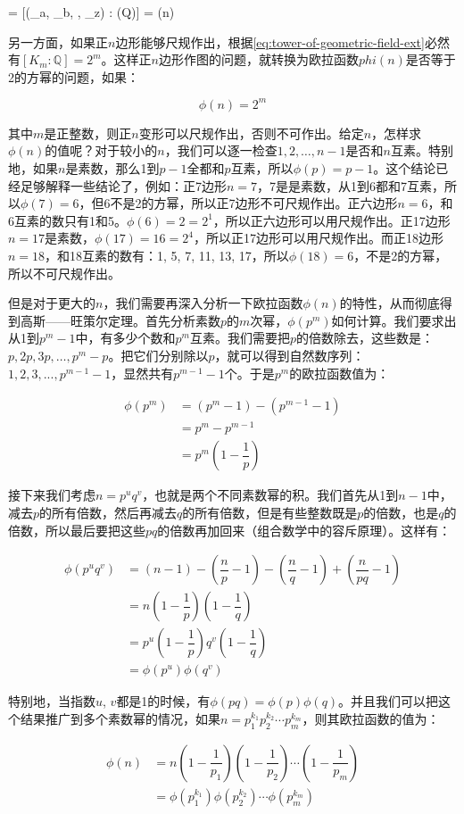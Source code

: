 \be
[K_m : \mathbb{Q}] = [(\zeta_a, \zeta_b, \dotsc, \zeta_z) : \mathbb(Q)] = \phi(n)
\ee

另一方面，如果正$n$边形能够尺规作出，根据\cref{eq:tower-of-geometric-field-ext}必然有$[K_m : \mathbb{Q}] = 2^m$。这样正$n$边形作图的问题，就转换为欧拉函数$phi(n)$是否等于2的方幂的问题，如果：

\[
\phi(n) = 2^m
\]

其中$m$是正整数，则正$n$变形可以尺规作出，否则不可作出。给定$n$，怎样求$\phi(n)$的值呢？对于较小的$n$，我们可以逐一检查$1, 2, \dotsc, n - 1$是否和$n$互素。特别地，如果$n$是素数，那么1到$p-1$全都和$p$互素，所以$\phi(p) = p - 1$。这个结论已经足够解释一些结论了，例如：正7边形$n = 7$，7是是素数，从1到6都和7互素，所以$\phi(7) = 6$，但6不是2的方幂，所以正7边形不可尺规作出。正六边形$n = 6$，和6互素的数只有1和5。$\phi(6) = 2 = 2^1$，所以正六边形可以用尺规作出。正17边形$n = 17$是素数，$\phi(17) = 16 = 2^4$，所以正17边形可以用尺规作出。而正18边形$n = 18$，和18互素的数有：1, 5, 7, 11, 13, 17，所以$\phi(18) = 6$，不是2的方幂，所以不可尺规作出。

但是对于更大的$n$，我们需要再深入分析一下欧拉函数$\phi(n)$的特性，从而彻底得到高斯——旺策尔定理。首先分析素数$p$的$m$次幂，$\phi(p^m)$如何计算。我们要求出从1到$p^m-1$中，有多少个数和$p^m$互素。我们需要把$p$的倍数除去，这些数是：$p, 2p, 3p, \dotsc, p^m - p$。把它们分别除以$p$，就可以得到自然数序列：$1, 2, 3, ..., p^{m-1} - 1$，显然共有$p^{m-1} - 1$个。于是$p^m$的欧拉函数值为：

\begin{align*}
\phi(p^m) &= (p^m - 1) - (p^{m-1} - 1) \\
            &= p^m - p^{m-1} \\
            &= p^m(1-\dfrac{1}{p})
\end{align*}

接下来我们考虑$n = p^uq^v$，也就是两个不同素数幂的积。我们首先从1到$n-1$中，减去$p$的所有倍数，然后再减去$q$的所有倍数，但是有些整数既是$p$的倍数，也是$q$的倍数，所以最后要把这些$pq$的倍数再加回来（组合数学中的容斥原理）。这样有：

\begin{align*}
\phi(p^uq^v) &=  (n - 1) - (\dfrac{n}{p} - 1) - (\dfrac{n}{q} - 1) + (\dfrac{n}{pq} - 1) \\
          &=  n(1 - \dfrac{1}{p})(1 - \dfrac{1}{q}) \\[5pt]
          &=  p^u(1 - \dfrac{1}{p})q^v(1 - \dfrac{1}{q}) \\[5pt]
          &=  \phi(p^u)\phi(q^v)
\end{align*}

特别地，当指数$u$, $v$都是1的时候，有$\phi(pq) = \phi(p)\phi(q)$。并且我们可以把这个结果推广到多个素数幂的情况，如果$n = p_1^{k_1} p_2^{k_2} \dotsm p_m^{k_m}$，则其欧拉函数的值为：

\begin{align*}
\phi(n) &= n(1-\dfrac{1}{p_1}) (1-\dfrac{1}{p_2}) \dotsm (1-\dfrac{1}{p_m}) \\[5pt]
    &= \phi(p_1^{k_1}) \phi(p_2^{k_2}) \dotsm \phi(p_m^{k_m})
\end{align*}
